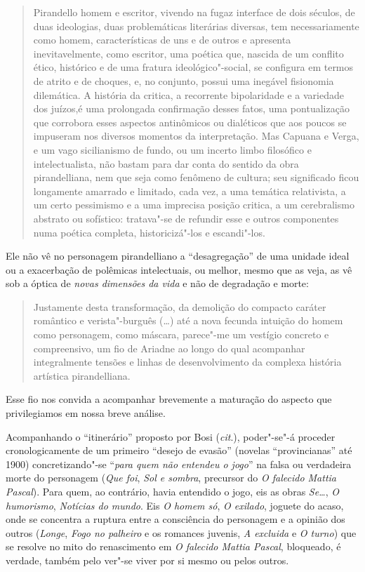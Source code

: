 \begin{quote}
Pirandello homem e escritor, vivendo na fugaz interface de dois
séculos, de duas ideologias, duas problemáticas literárias diversas, tem
necessariamente como homem, características de uns e de outros e
apresenta inevitavelmente, como escritor, uma poética que, nascida de um
conflito ético, histórico e de uma fratura ideológico"-social, se
configura em termos de atrito e de choques, e, no conjunto, possui uma
inegável fisionomia dilemática. A história da critica, a recorrente
bipolaridade e a variedade dos juízos,é uma prolongada confirmação
desses fatos, uma pontualização que corrobora esses aspectos
antinômicos ou dialéticos que aos poucos se impuseram nos diversos
momentos da interpretação. Mas Capuana e Verga, e um vago sicilianismo
de fundo, ou um incerto limbo filosófico e intelectualista, não
bastam para dar conta do sentido da obra pirandelliana, nem que seja
como fenômeno de cultura; seu significado ficou longamente amarrado e
limitado, cada vez, a uma temática relativista, a um certo pessimismo e a
uma imprecisa posição critica, a um cerebralismo abstrato ou sofístico:
tratava"-se de refundir esse e outros componentes numa poética completa,
historicizá"-los e escandi"-los.
\end{quote}

Ele não vê no personagem pirandelliano a ``desagregação'' de uma unidade
ideal ou a exacerbação de polêmicas intelectuais, ou melhor, mesmo que
as veja, as vê sob a óptica de \emph{novas dimensões da vida} e não de
degradação e morte:

\begin{quote}
Justamente desta transformação, da demolição do compacto
caráter romântico e verista"-burguês (\ldots{}) até a nova fecunda
intuição do homem como personagem, como máscara, parece"-me
um vestígio concreto e compreensivo, um fio de Ariadne ao longo do qual
acompanhar integralmente tensões e linhas de desenvolvimento da complexa
história artística pirandelliana.
\end{quote}

Esse fio nos convida a acompanhar brevemente a maturação do aspecto que
privilegiamos em nossa breve análise.

Acompanhando o ``itinerário'' proposto por Bosi (\emph{cit}.),
poder"-se"-á proceder cronologicamente de um primeiro ``desejo de evasão''
(novelas ``provincianas'' até 1900) concretizando"-se ``\emph{para quem
não entendeu o jogo}'' na falsa ou verdadeira morte do personagem
(\emph{Que foi}, \emph{Sol e sombra}, precursor do \emph{O falecido Mattia Pascal}). Para quem, ao contrário, havia entendido o jogo,
eis as obras \emph{Se\ldots{}}, \emph{O humorismo}, \emph{Notícias do mundo}.
Eis \emph{O homem só}, \emph{O exilado}, joguete do acaso, onde
se concentra a ruptura entre a consciência do personagem e a opinião dos
outros (\emph{Longe}, \emph{Fogo no palheiro} e os romances juvenis,
\emph{A excluida} e \emph{O turno}) que se resolve no mito do
renascimento em \emph{O falecido Mattia Pascal}, bloqueado, é verdade,
também pelo ver"-se viver por si mesmo ou pelos outros.


